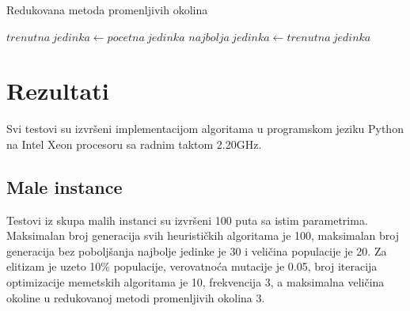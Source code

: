 \documentclass[12pt, a4paper]{article}
\theoremstyle{definition}
\begin{document}
\begin{algorithm}[H]
\caption{Redukovana metoda promenljivih okolina}
\label{alg:5}
$trenutna\ jedinka \gets pocetna\ jedinka$\;
$najbolja\ jedinka \gets trenutna\ jedinka$\;
\end{algorithm}

\section{Rezultati}

Svi testovi su izvršeni implementacijom algoritama u programskom jeziku Python na Intel Xeon procesoru sa radnim taktom 2.20GHz.

\subsection{Male instance}

Testovi iz skupa malih instanci su izvršeni 100 puta sa istim parametrima. Maksimalan broj generacija svih heurističkih algoritama je 100, maksimalan broj generacija bez poboljšanja najbolje jedinke je 30 i veličina populacije je 20. Za elitizam je uzeto 10\% populacije, verovatnoća mutacije je 0.05, broj iteracija optimizacije memetskih algoritama je 10, frekvencija 3, a maksimalna veličina okoline u redukovanoj metodi promenljivih okolina 3.
\end{document}
